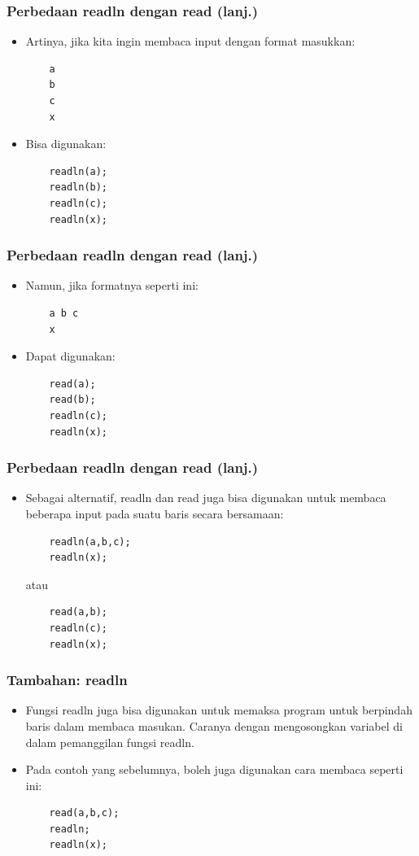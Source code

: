 \documentclass{beamer}
\begin{document}
\begin{frame}[fragile]
\frametitle{Perbedaan readln dengan read (lanj.)}
\begin{itemize}
	\item Artinya, jika kita ingin membaca input dengan format masukkan:
	\begin{lstlisting}
	a
	b
	c
	x
	\end{lstlisting}
	\item Bisa digunakan:
	\begin{lstlisting}
	readln(a);
	readln(b);
	readln(c);
	readln(x);
	\end{lstlisting}
\end{itemize}
\end{frame}

\begin{frame}[fragile]
\frametitle{Perbedaan readln dengan read (lanj.)}
\begin{itemize}
	\item Namun, jika formatnya seperti ini:
	\begin{lstlisting}
	a b c
	x
	\end{lstlisting}
	\item Dapat digunakan:
	\begin{lstlisting}
	read(a);
	read(b);
	readln(c);
	readln(x);
	\end{lstlisting}
\end{itemize}
\end{frame}

\begin{frame}[fragile]
\frametitle{Perbedaan readln dengan read (lanj.)}
\begin{itemize}
	\item Sebagai alternatif, readln dan read juga bisa digunakan untuk membaca beberapa input pada suatu baris secara bersamaan:
	\begin{lstlisting}
	readln(a,b,c);
	readln(x);
	\end{lstlisting}
	atau
	\begin{lstlisting}
	read(a,b);
	readln(c);
	readln(x);
	\end{lstlisting}
\end{itemize}
\end{frame}

\begin{frame}[fragile]
\frametitle{Tambahan: readln}
\begin{itemize}
	\item Fungsi readln juga bisa digunakan untuk memaksa program untuk berpindah baris dalam membaca masukan. Caranya dengan mengosongkan variabel di dalam pemanggilan fungsi readln.
	\item Pada contoh yang sebelumnya, boleh juga digunakan cara membaca seperti ini:
	\begin{lstlisting}
	read(a,b,c);
	readln;
	readln(x);
	\end{lstlisting}
\end{itemize}
\end{frame}
\end{document}
